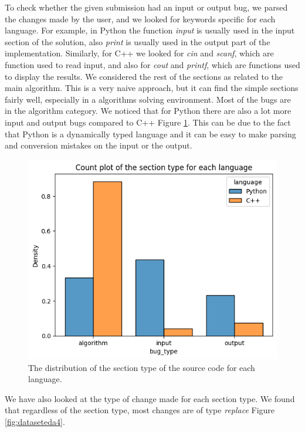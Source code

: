 \documentclass[12pt,a4paper]{report}
\begin{document}
\newpage

To check whether the given submission had an input or output bug, we parsed the changes made by the user, and we looked for keywords specific for each language. For example, in Python the function \textit{input} is usually used in the input section of the solution, also \textit{print} is usually used in the output part of the implementation. Similarly, for C++ we looked for \textit{cin} and \textit{scanf}, which are function used to read input, and also for \textit{cout} and \textit{printf}, which are functions used to display the results. We considered the rest of the sections as related to the main algorithm. This is a very naive approach, but it can find the simple sections fairly well, especially in a algorithms solving environment. Most of the bugs are in the algorithm category. We noticed that for Python there are also a lot more input and output bugs compared to C++ Figure \ref{fig:dataseteda3}. This can be due to the fact that Python is a dynamically typed language and it can be easy to make parsing and conversion mistakes on the input or the output.

\begin{figure}[hp!]
\centering
\includegraphics[width=\textwidth]{pics/submissiontype.png}
  \caption{The distribution of the section type of the source code for each language.}
  \label{fig:dataseteda3}
\end{figure}

\newpage

We have also looked at the type of change made for each section type. We found that regardless of the section type, most changes are of type \textit{replace} Figure \ref{fig:dataseteda4}.
\end{document}
